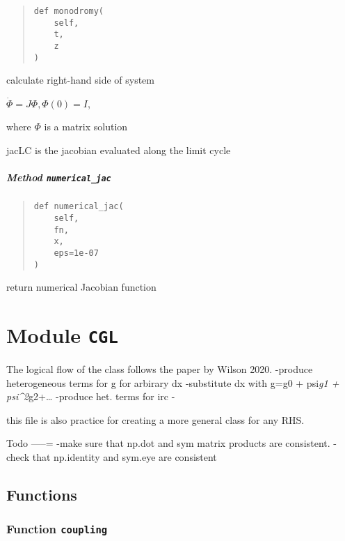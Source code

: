 \documentclass[
  english,
  a4paper,
  oneside]{article}
\begin{document}
\begin{quote}
\begin{verbatim}
def monodromy(
    self,
    t,
    z
)
\end{verbatim}
\end{quote}

calculate right-hand side of system

\(\dot \Phi = J\Phi, \Phi(0)=I\),

where \(\Phi\) is a matrix solution

jacLC is the jacobian evaluated along the limit cycle

\hypertarget{StrongCoupling.StrongCoupling.numerical_jac}{%
\subparagraph{\texorpdfstring{Method
\texttt{numerical\_jac}}{Method numerical\_jac}}\label{StrongCoupling.StrongCoupling.numerical_jac}}

\begin{quote}
\begin{verbatim}
def numerical_jac(
    self,
    fn,
    x,
    eps=1e-07
)
\end{verbatim}
\end{quote}

return numerical Jacobian function

\hypertarget{CGL}{%
\section{\texorpdfstring{Module \texttt{CGL}}{Module CGL}}\label{CGL}}

The logical flow of the class follows the paper by Wilson 2020. -produce
heterogeneous terms for g for arbirary dx -substitute dx with g=g0 +
psi\emph{g1 + psi\^{}2}g2+\ldots{} -produce het. terms for irc -

this file is also practice for creating a more general class for any
RHS.

Todo -----= -make sure that np.dot and sym matrix products are
consistent. -check that np.identity and sym.eye are consistent

\hypertarget{functions-1}{%
\subsection{Functions}\label{functions-1}}

\hypertarget{CGL.coupling}{%
\subsubsection{\texorpdfstring{Function
\texttt{coupling}}{Function coupling}}\label{CGL.coupling}}
\end{document}
